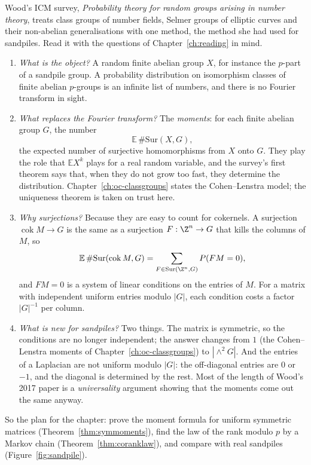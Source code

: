 Wood's ICM survey, \emph{Probability theory for random groups arising in number theory}, treats class groups of number fields, Selmer groups of elliptic curves and their non-abelian generalisations with one method, the method she had used for sandpiles. Read it with the questions of Chapter~\ref{ch:reading} in mind.
\begin{enumerate}
\item \emph{What is the object?} A random finite abelian group $X$, for instance the $p$-part of a sandpile group. A probability distribution on isomorphism classes of finite abelian $p$-groups is an infinite list of numbers, and there is no Fourier transform in sight.
\item \emph{What replaces the Fourier transform?} The \emph{moments}: for each finite abelian group $G$, the number
\[
\mathbb E\,\#\mathrm{Sur}(X,G),
\]
the expected number of surjective homomorphisms from $X$ onto $G$. They play the role that $\mathbb EX^k$ plays for a real random variable, and the survey's first theorem says that, when they do not grow too fast, they determine the distribution. Chapter~\ref{ch:oc-classgroups} states the Cohen--Lenstra model; the uniqueness theorem is taken on trust here.
\item \emph{Why surjections?} Because they are easy to count for cokernels. A surjection $\operatorname{cok}M\to G$ is the same as a surjection $F:\Z^n\to G$ that kills the columns of $M$, so
\[
\mathbb E\,\#\mathrm{Sur}(\operatorname{cok}M,G)=\sum_{F\in\mathrm{Sur}(\Z^n,G)}P(FM=0),
\]
and $FM=0$ is a system of linear conditions on the entries of $M$. For a matrix with independent uniform entries modulo $|G|$, each condition costs a factor $|G|^{-1}$ per column.
\item \emph{What is new for sandpiles?} Two things. The matrix is symmetric, so the conditions are no longer independent; the answer changes from $1$ (the Cohen--Lenstra moments of Chapter~\ref{ch:oc-classgroups}) to $|\wedge^2G|$. And the entries of a Laplacian are not uniform modulo $|G|$: the off-diagonal entries are $0$ or $-1$, and the diagonal is determined by the rest. Most of the length of Wood's 2017 paper is a \emph{universality} argument showing that the moments come out the same anyway.
\end{enumerate}

So the plan for the chapter: prove the moment formula for uniform symmetric matrices (Theorem~\ref{thm:symmoments}), find the law of the rank modulo $p$ by a Markov chain (Theorem~\ref{thm:coranklaw}), and compare with real sandpiles (Figure~\ref{fig:sandpile}).

